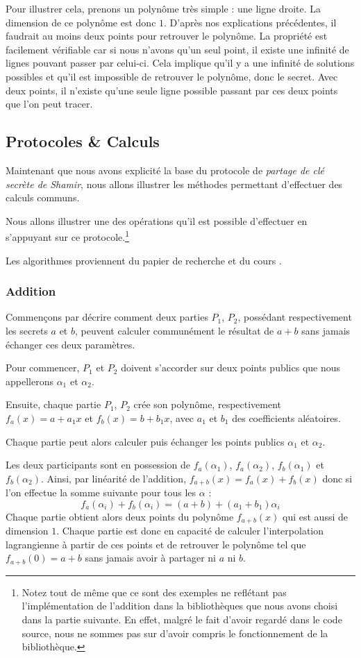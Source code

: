 \documentclass[12pt,a4paper]{article}
\begin{document}
Pour illustrer cela, prenons un polynôme très simple : une ligne droite. La dimension de ce polynôme est donc $1$. D'après nos explications précédentes, il faudrait au moins deux points pour retrouver le polynôme. La propriété est facilement vérifiable car si nous n'avons qu'un seul point, il existe une infinité de lignes pouvant passer par celui-ci. Cela implique qu'il y a une infinité de solutions possibles et qu'il est impossible de retrouver le polynôme, donc le secret. Avec deux points, il n'existe qu'une seule ligne possible passant par ces deux points que l'on peut tracer.

\subsection{Protocoles \& Calculs}
Maintenant que nous avons explicité la base du protocole de \textit{partage de clé secrète de Shamir}, nous allons illustrer les méthodes permettant d'effectuer des calculs communs.

Nous allons illustrer une des opérations qu'il est possible d'effectuer en s'appuyant sur ce protocole.\footnote{Notez tout de même que ce sont des exemples ne reflétant pas l'implémentation de l'addition dans la bibliothèques que nous avons choisi dans la partie suivante. En effet, malgré le fait d'avoir regardé dans le code source, nous ne sommes pas sur d'avoir compris le fonctionnement de la bibliothèque.}

Les algorithmes proviennent du papier de recherche \cite{SSS_SMC} et du cours \cite{SMC_LIN}.


\subsubsection{Addition}
Commençons par décrire comment deux parties $P_1$, $P_2$, possédant respectivement les secrets $a$ et $b$, peuvent calculer communément le résultat de $a + b$ sans jamais échanger ces deux paramètres.

Pour commencer, $P_1$ et $P_2$ doivent s'accorder sur deux points publics que nous appellerons $\alpha_1$ et $\alpha_2$.

Ensuite, chaque partie $P_1$, $P_2$ crée son polynôme, respectivement $f_a(x) = a + a_1x$ et $f_b(x) = b + b_1x$, avec $a_1$ et $b_1$ des coefficients aléatoires.

Chaque partie peut alors calculer puis échanger les points publics $\alpha_1$ et $\alpha_2$. 

Les deux participants sont en possession de $f_a(\alpha_1)$, $f_a(\alpha_2)$, $f_b(\alpha_1)$ et $f_b(\alpha_2)$. Ainsi, par linéarité de l'addition, $f_{a+b}(x) = f_a(x) + f_b(x)$ donc si l'on effectue la somme suivante pour tous les $\alpha$ :
\[
    f_a(\alpha_i) + f_b(\alpha_i) = (a + b) + (a_1 + b_1)\alpha_i
\]
Chaque partie obtient alors deux points du polynôme $f_{a+ b}(x)$ qui est aussi de dimension $1$. Chaque partie est donc en capacité de calculer l'interpolation lagrangienne à partir de ces points et de retrouver le polynôme tel que $f_{a+b}(0) = a + b$ sans jamais avoir à partager ni $a$ ni $b$.
\end{document}
